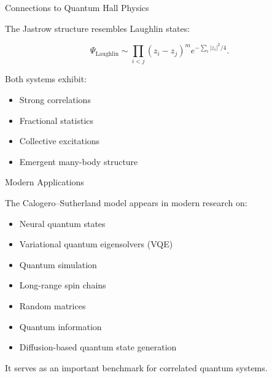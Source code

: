 \documentclass{beamer}
\begin{document}
\begin{frame}{Connections to Quantum Hall Physics}

The Jastrow structure resembles Laughlin states:

\[
\Psi_{\mathrm{Laughlin}}
\sim
\prod_{i<j}
(z_i-z_j)^m
e^{-\sum_i |z_i|^2/4}.
\]

\vspace{0.3cm}

Both systems exhibit:

\begin{itemize}
    \item Strong correlations
    \item Fractional statistics
    \item Collective excitations
    \item Emergent many-body structure
\end{itemize}

\end{frame}

\begin{frame}{Modern Applications}

The Calogero--Sutherland model appears in modern research on:

\begin{itemize}
    \item Neural quantum states
    \item Variational quantum eigensolvers (VQE)
    \item Quantum simulation
    \item Long-range spin chains
    \item Random matrices
    \item Quantum information
    \item Diffusion-based quantum state generation
\end{itemize}

\vspace{0.3cm}

It serves as an important benchmark for correlated quantum systems.

\end{frame}
\end{document}
